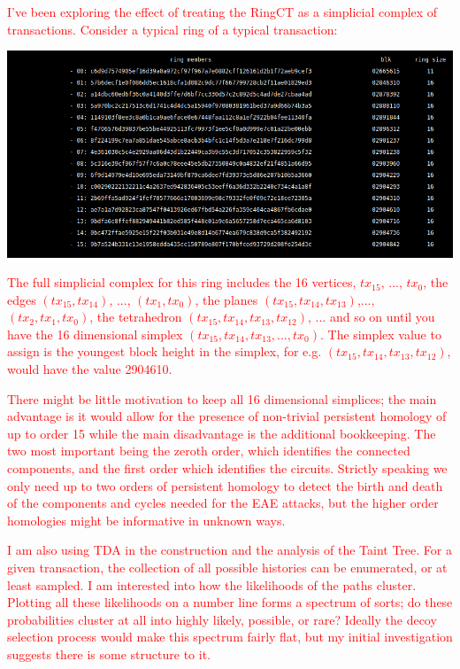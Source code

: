 \documentclass[prc, 12pt]{revtex4-1}
\begin{document}
\textcolor{red}{
I've been exploring the effect of treating the RingCT as a simplicial complex of transactions.  Consider a typical ring of a typical transaction:
}

\includegraphics[scale=0.5]{ringct}

\textcolor{red}{The full simplicial complex for this ring includes the 16 vertices, $tx_{15}$, ..., $tx_0$, the edges $(tx_{15}, tx_{14})$, ..., $(tx_1, tx_0)$, the planes $(tx_{15}, tx_{14}, tx_{13})$,...,$(tx_2,tx_1,tx_0)$, the tetrahedron $(tx_{15}, tx_{14}, tx_{13}, tx_{12})$, ... and so on until you have the 16 dimensional simplex $(tx_{15}, tx_{14}, tx_{13}, ..., tx_0)$.  The simplex value to assign is the youngest block height in the simplex, for e.g. $(tx_{15}, tx_{14}, tx_{13}, tx_{12})$, would have the value 2904610.}

\textcolor{red}{There might be little motivation to keep all 16 dimensional simplices; the main advantage is it would allow for the presence of non-trivial persistent homology of up to order 15 while the main disadvantage is the additional bookkeeping.  The two most important being the zeroth order, which identifies the connected components, and the first order which identifies the circuits.  Strictly speaking we only need up to two orders of persistent homology to detect the birth and death of the components and cycles needed for the EAE attacks, but the higher order homologies might be informative in unknown ways.}
 
\textcolor{red}{I am also using TDA in the construction and the analysis of the Taint Tree.  For a given transaction, the collection of all possible histories can be enumerated, or at least sampled.  I am interested into how the likelihoods of the paths cluster.  Plotting all these likelihoods on a number line forms a spectrum of sorts; do these probabilities cluster at all into highly likely, possible, or rare?  Ideally the decoy selection process would make this spectrum fairly flat, but my initial investigation suggests there is some structure to it.}
\end{document}
